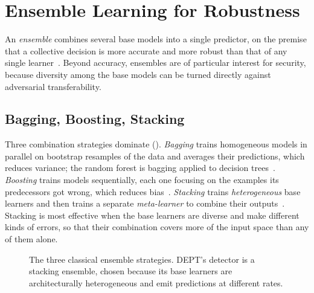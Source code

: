 \section{Ensemble Learning for Robustness}\label{sec:bg-ensembles}
An \emph{ensemble} combines several base models into a single predictor, on the premise
that a collective decision is more accurate and more robust than that of any single
learner~\cite{lucas2023comprehensive,bibers2025ensemble}. Beyond accuracy, ensembles are of
particular interest for security, because diversity among the base models can be turned
directly against adversarial transferability.

\subsection{Bagging, Boosting, Stacking}\label{subsec:bg-ensemble-types}
Three combination strategies dominate (). \emph{Bagging} trains
homogeneous models in parallel on bootstrap resamples of the data and averages their
predictions, which reduces variance; the random forest is bagging applied to decision
trees~\cite{breiman1996bagging,breiman2001random}. \emph{Boosting} trains models
sequentially, each one focusing on the examples its predecessors got wrong, which reduces
bias~\cite{freund1997decision}. \emph{Stacking} trains \emph{heterogeneous} base learners
and then trains a separate \emph{meta-learner} to combine their
outputs~\cite{wolpert1992stacked}. Stacking is most effective when the base
learners are diverse and make different kinds of errors, so that their combination covers
more of the input space than any of them alone.

\begin{figure}[htbp]
    \centering
    \hfill
    \hfill
    \caption[The three classical ensemble strategies.]{The three classical ensemble strategies. DEPT's detector is a stacking ensemble, chosen because its base learners are architecturally heterogeneous and emit predictions at different rates.}
    \label{fig:bg-ensembles}
\end{figure}

